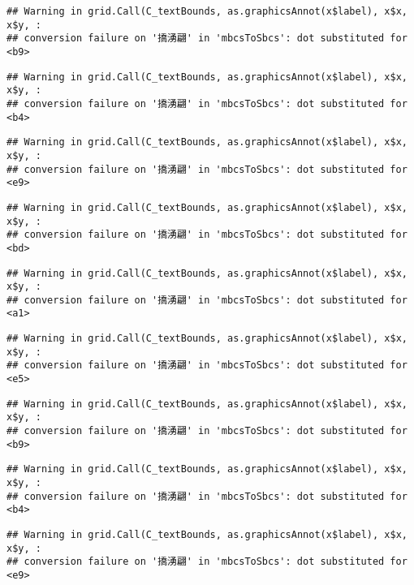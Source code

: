 \documentclass[
]{article}
\begin{document}
\begin{verbatim}
## Warning in grid.Call(C_textBounds, as.graphicsAnnot(x$label), x$x, x$y, :
## conversion failure on '撟湧翩' in 'mbcsToSbcs': dot substituted for <b9>
\end{verbatim}

\begin{verbatim}
## Warning in grid.Call(C_textBounds, as.graphicsAnnot(x$label), x$x, x$y, :
## conversion failure on '撟湧翩' in 'mbcsToSbcs': dot substituted for <b4>
\end{verbatim}

\begin{verbatim}
## Warning in grid.Call(C_textBounds, as.graphicsAnnot(x$label), x$x, x$y, :
## conversion failure on '撟湧翩' in 'mbcsToSbcs': dot substituted for <e9>
\end{verbatim}

\begin{verbatim}
## Warning in grid.Call(C_textBounds, as.graphicsAnnot(x$label), x$x, x$y, :
## conversion failure on '撟湧翩' in 'mbcsToSbcs': dot substituted for <bd>
\end{verbatim}

\begin{verbatim}
## Warning in grid.Call(C_textBounds, as.graphicsAnnot(x$label), x$x, x$y, :
## conversion failure on '撟湧翩' in 'mbcsToSbcs': dot substituted for <a1>
\end{verbatim}

\begin{verbatim}
## Warning in grid.Call(C_textBounds, as.graphicsAnnot(x$label), x$x, x$y, :
## conversion failure on '撟湧翩' in 'mbcsToSbcs': dot substituted for <e5>
\end{verbatim}

\begin{verbatim}
## Warning in grid.Call(C_textBounds, as.graphicsAnnot(x$label), x$x, x$y, :
## conversion failure on '撟湧翩' in 'mbcsToSbcs': dot substituted for <b9>
\end{verbatim}

\begin{verbatim}
## Warning in grid.Call(C_textBounds, as.graphicsAnnot(x$label), x$x, x$y, :
## conversion failure on '撟湧翩' in 'mbcsToSbcs': dot substituted for <b4>
\end{verbatim}

\begin{verbatim}
## Warning in grid.Call(C_textBounds, as.graphicsAnnot(x$label), x$x, x$y, :
## conversion failure on '撟湧翩' in 'mbcsToSbcs': dot substituted for <e9>
\end{verbatim}
\end{document}
